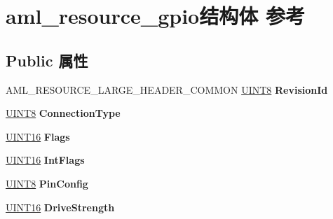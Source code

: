 \hypertarget{structaml__resource__gpio}{}\section{aml\+\_\+resource\+\_\+gpio结构体 参考}
\label{structaml__resource__gpio}
\subsection*{Public 属性}
\begin{DoxyCompactItemize}
\item 
\mbox{\label{structaml__resource__gpio_a4d48d119f8fc830b698832b01c8b7e9f}} 
A\+M\+L\+\_\+\+R\+E\+S\+O\+U\+R\+C\+E\+\_\+\+L\+A\+R\+G\+E\+\_\+\+H\+E\+A\+D\+E\+R\+\_\+\+C\+O\+M\+M\+ON \hyperlink{_processor_bind_8h_ab27e9918b538ce9d8ca692479b375b6a}{U\+I\+N\+T8} {\bfseries Revision\+Id}
\item 
\mbox{\label{structaml__resource__gpio_a442feeca7c3603b6221c092b72ba63de}} 
\hyperlink{_processor_bind_8h_ab27e9918b538ce9d8ca692479b375b6a}{U\+I\+N\+T8} {\bfseries Connection\+Type}
\item 
\mbox{\label{structaml__resource__gpio_a5f793959a0d4eb61dc4b6bd72cab1abb}} 
\hyperlink{_processor_bind_8h_a09f1a1fb2293e33483cc8d44aefb1eb1}{U\+I\+N\+T16} {\bfseries Flags}
\item 
\mbox{\label{structaml__resource__gpio_afefff40aabdfb587b68b57959b120501}} 
\hyperlink{_processor_bind_8h_a09f1a1fb2293e33483cc8d44aefb1eb1}{U\+I\+N\+T16} {\bfseries Int\+Flags}
\item 
\mbox{\label{structaml__resource__gpio_a35d8dedb3926cbd4516f68aa374bd344}} 
\hyperlink{_processor_bind_8h_ab27e9918b538ce9d8ca692479b375b6a}{U\+I\+N\+T8} {\bfseries Pin\+Config}
\item 
\mbox{\label{structaml__resource__gpio_a4b38b6072b24e8fab2c290f35af74f66}} 
\hyperlink{_processor_bind_8h_a09f1a1fb2293e33483cc8d44aefb1eb1}{U\+I\+N\+T16} {\bfseries Drive\+Strength}
\item 
\mbox{\label{structaml__resource__gpio_a20fb2fbddc4688952f39e26abeab487f}} 

\end{DoxyCompactItemize}
